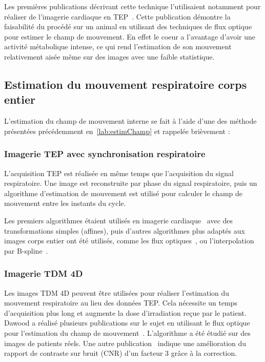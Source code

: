 Les premières publications décrivant cette technique l'utilisaient notamment pour réaliser de l'imagerie cardiaque en TEP~\cite{klein19973d}. Cette publication démontre la faisabilité du procédé sur un animal en utilisant des techniques de flux optique pour estimer le champ de mouvement. En effet le coeur a l'avantage d'avoir une activité métabolique intense, ce qui rend l'estimation de son mouvement relativement aisée même sur des images avec une faible statistique.




\subsection{Estimation du mouvement respiratoire corps entier}

L'estimation du champ de mouvement interne se fait à l'aide d'une des méthode présentées précédemment en~\ref{lab:estimChamp} et rappelée brièvement :

\subsubsection{Imagerie TEP avec synchronisation respiratoire}
\label{lab:correctionDawood2008}

L'acquisition TEP est réalisée en même temps que l'acquisition du signal respiratoire. Une image est reconstruite par phase du signal respiratoire, puis un algorithme d'estimation de mouvement est utilisé pour calculer le champ de mouvement entre les instants du cycle.

Les premiers algorithmes étaient utilisés en imagerie cardiaque~\cite{klein2002four} avec des transformations simples (affines), puis d'autres algorithmes plus adaptés aux images corps entier ont été utilisés, comme les flux optiques~\cite{dawood2006lung, dawood2006lung}, ou l'interpolation par B-spline~\cite{bai2009regularized}. 


\subsubsection{Imagerie TDM 4D}

Les images TDM 4D peuvent être utilisées pour réaliser l'estimation du mouvement respiratoire au lieu des données TEP. Cela nécessite un temps d'acquisition plus long et augmente la dose d'irradiation reçue par le patient.
Dawood a réalisé plusieurs publications sur le sujet en utilisant le flux optique pour l'estimation du champ de mouvement~\cite{dawood2006lung, dawood2008respiratory}. L'algorithme a été étudié sur des images de patients réels. Une autre publication~\cite{thorndyke2006reducing} indique une amélioration du rapport de contraste sur bruit (CNR) d'un facteur 3 grâce à la correction.


